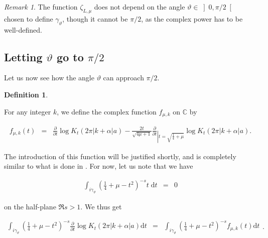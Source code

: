 \documentclass{jams-l}
\theoremstyle{definition}
\newtheorem{definition}[theorem]{Definition}
\theoremstyle{remark}
\newtheorem{remark}[theorem]{Remark}
\numberwithin{equation}{section}
\begin{document}
        \begin{remark}
        
            The function $\zeta_{L,\mu}$ does not depend on the angle $\vartheta \in \left] 0, \pi/2 \right[$ chosen to define $\gamma_{\vartheta}$, though it cannot be $\pi/2$, as the complex power has to be well-defined.
        
        \end{remark}
    
    
    \subsection{\texorpdfstring{Letting $\vartheta$ go to $\pi/2$}{Letting vartheta go to pi/2}}
    \label{SubSecLettingThetaPiOver2}
    
        Let us now see how the angle $\vartheta$ can approach $\pi/2$.
        
        \begin{definition}
        \label{Deffmuk}
        
            For any integer $k$, we define the complex function $f_{\mu,k}$ on $\mathbb{C}$ by
            
            \[ \begin{array}{lll}
                    f_{\mu,k} \left( t \right) & = & \frac{\partial}{\partial t} \log K_t \left( 2\pi \left \vert k + \alpha \right \vert a \right) - \frac{2t}{\sqrt{4 \mu + 1}} \frac{\partial}{\partial t}_{\left \vert t = \sqrt{\frac{1}{4} + \mu} \right.} \log K_t \left( 2 \pi \left \vert k + \alpha \right \vert a \right).
                \end{array} \]
            
        \end{definition}
        
        The introduction of this function will be justified shortly, and is completely similar to what is done in \cite[Sec. 6.1]{MR4167014}. For now, let us note that we have
        
        \[ \begin{array}{lll}
                \int_{i \gamma_{\vartheta}} \left( \frac{1}{4} + \mu - t^2 \right)^{-s} t \; \mathrm{d}t & = & 0
            \end{array} \]
        
        \noindent on the half-plane $\Re s > 1$. We thus get
        
        \[ \begin{array}{lll}
                \int_{i \gamma_{\vartheta}} \left( \frac{1}{4} + \mu - t^2 \right)^{-s} \frac{\partial}{\partial t} \log K_t \left( 2 \pi \left \vert k + \alpha \right \vert a \right) \mathrm{d}t & = & \int_{i \gamma_{\vartheta}} \left( \frac{1}{4} + \mu - t^2 \right)^{-s} f_{\mu,k} \left( t \right) \mathrm{d}t
            \end{array} . \]
        
\end{document}

